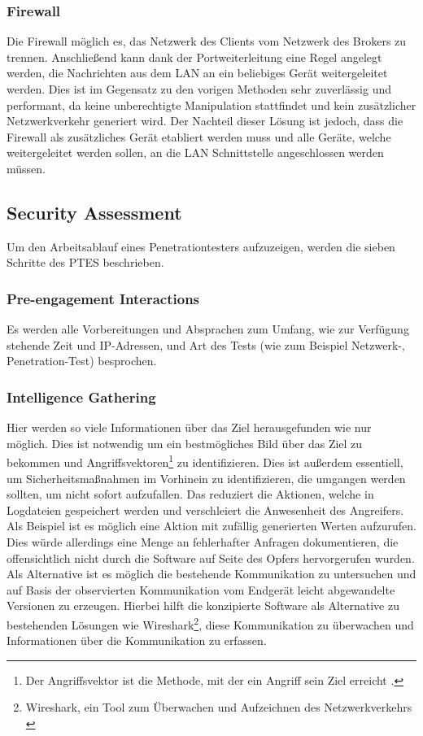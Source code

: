         \subsubsection{Firewall}
        Die Firewall möglich es, das Netzwerk des Clients vom Netzwerk des Brokers zu trennen. Anschließend kann dank der Portweiterleitung eine Regel angelegt werden, die Nachrichten aus dem \ac{LAN} an ein beliebiges Gerät weitergeleitet werden. Dies ist im Gegensatz zu den vorigen Methoden sehr zuverlässig und performant, da keine unberechtigte Manipulation stattfindet und kein zusätzlicher Netzwerkverkehr generiert wird. Der Nachteil dieser Lösung ist jedoch, dass die Firewall als zusätzliches Gerät etabliert werden muss und alle Geräte, welche weitergeleitet werden sollen, an die \ac{LAN} Schnittstelle angeschlossen werden müssen.
        
    \subsection{Security Assessment}
        Um den Arbeitsablauf eines Penetrationtesters aufzuzeigen, werden die sieben Schritte des \ac{PTES} \cite{hsiangchih_2019} beschrieben.
    
    \subsubsection{\glqq Pre-engagement Interactions\grqq{}}
        Es werden alle Vorbereitungen und Absprachen zum Umfang, wie zur Verfügung stehende Zeit und \acs{IP}-Adressen, und Art des Tests (wie zum Beispiel Netzwerk-, Penetration-Test) besprochen.
    \subsubsection{\glqq Intelligence Gathering\grqq{}}
        Hier werden so viele Informationen über das Ziel herausgefunden wie nur möglich. Dies ist notwendig um ein bestmögliches Bild über das Ziel zu bekommen und Angriffsvektoren\footnote{Der Angriffsvektor ist die Methode, mit der ein Angriff sein Ziel erreicht \cite{HANSMAN200531}.} zu identifizieren. Dies ist außerdem essentiell, um Sicherheitsmaßnahmen im Vorhinein zu identifizieren, die umgangen werden sollten, um nicht sofort aufzufallen. Das reduziert die Aktionen, welche in Logdateien gespeichert werden und verschleiert die Anwesenheit des Angreifers. Als Beispiel ist es möglich eine Aktion mit zufällig generierten Werten aufzurufen. Dies würde allerdings eine Menge an fehlerhafter Anfragen dokumentieren, die offensichtlich nicht durch die Software auf Seite des Opfers hervorgerufen wurden. Als Alternative ist es möglich die bestehende Kommunikation zu untersuchen und auf Basis der observierten Kommunikation vom Endgerät leicht abgewandelte Versionen zu erzeugen. Hierbei hilft die konzipierte Software als Alternative zu bestehenden Lösungen wie Wireshark\footnote{Wireshark, ein Tool zum Überwachen und Aufzeichnen des Netzwerkverkehrs \cite{SandersChris2017Ppa}}, diese Kommunikation zu überwachen und Informationen über die Kommunikation zu erfassen.
